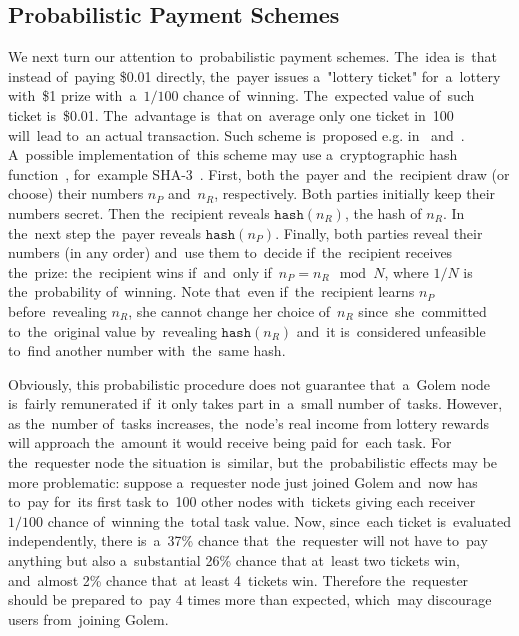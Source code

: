 \documentclass[a4paper]{article}
\newcommand{\hash}[1]{\mathtt{hash}({#1})}
\begin{document}
\subsection{Probabilistic Payment Schemes}
    We next turn our attention to~probabilistic payment schemes. The~idea  is~that instead of~paying \$0.01 directly,
    the~payer issues a~"lottery ticket" for~a~lottery with~\$1 prize with~a~$1/100$ chance of~winning. The~expected
    value of~such ticket is~\$0.01. The~advantage is~that on~average only one ticket in~100 will~lead to~an actual
    transaction. Such scheme is~proposed e.g. in~\cite{RIVEST} and~\cite{WHEELER}.
    A~possible implementation of~this scheme may use a~cryptographic hash function~\cite{CRYPTOHANDBOOK},
    for~example SHA-3~\cite{SHA3}. First, both
    the~payer and~the~recipient draw (or choose) their numbers $n_P$ and~$n_R$, respectively.
    Both parties initially keep their numbers secret. Then the~recipient reveals $\hash{n_R}$, the hash of $n_R$.
    In the~next step the~payer reveals $\hash{n_P}$. Finally, both parties reveal their numbers (in any order)
    and~use them to~decide if~the~recipient receives the~prize: the~recipient wins if~and~only if~$n_P = n_R \mod N$,
    where $1/N$ is 
    the~probability of~winning. Note that~even if~the~recipient learns $n_P$ before~revealing $n_R$, she cannot change
    her choice of~$n_R$ since~she~committed to~the~original value by~revealing $\hash{n_R}$ and~it is~considered
    unfeasible to~find another number with~the~same hash.

    Obviously, this probabilistic procedure does not guarantee that~a~Golem node is~fairly remunerated if~it only
    takes part in~a~small number of~tasks. However, as the~number of~tasks increases, the~node's real income from
    lottery rewards will approach the~amount it would receive being paid for~each task. For the~requester node the
    situation is~similar, but the~probabilistic effects may be more problematic: suppose a~requester node just
    joined Golem and~now has to~pay for~its first task to~100 other nodes with~tickets giving each receiver
    $1/100$ chance of~winning the~total task value. Now, since~each ticket is~evaluated independently,
    there is~a~37\% chance that~the~requester will not have to~pay anything but also a~substantial 26\% chance that
    at~least two tickets win, and~almost 2\% chance that~at least 4~tickets win. Therefore the~requester should be
    prepared to~pay 4 times more than expected, which~may discourage users from~joining Golem.
\end{document}
